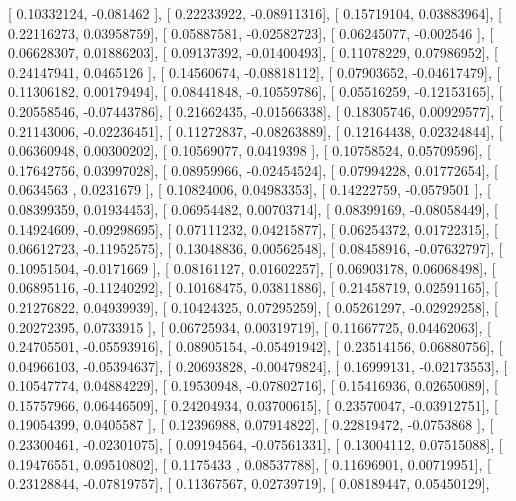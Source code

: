 \documentclass{article}
\begin{document}
       [ 0.10332124, -0.081462  ],
       [ 0.22233922, -0.08911316],
       [ 0.15719104,  0.03883964],
       [ 0.22116273,  0.03958759],
       [ 0.05887581, -0.02582723],
       [ 0.06245077, -0.002546  ],
       [ 0.06628307,  0.01886203],
       [ 0.09137392, -0.01400493],
       [ 0.11078229,  0.07986952],
       [ 0.24147941,  0.0465126 ],
       [ 0.14560674, -0.08818112],
       [ 0.07903652, -0.04617479],
       [ 0.11306182,  0.00179494],
       [ 0.08441848, -0.10559786],
       [ 0.05516259, -0.12153165],
       [ 0.20558546, -0.07443786],
       [ 0.21662435, -0.01566338],
       [ 0.18305746,  0.00929577],
       [ 0.21143006, -0.02236451],
       [ 0.11272837, -0.08263889],
       [ 0.12164438,  0.02324844],
       [ 0.06360948,  0.00300202],
       [ 0.10569077,  0.0419398 ],
       [ 0.10758524,  0.05709596],
       [ 0.17642756,  0.03997028],
       [ 0.08959966, -0.02454524],
       [ 0.07994228,  0.01772654],
       [ 0.0634563 ,  0.0231679 ],
       [ 0.10824006,  0.04983353],
       [ 0.14222759, -0.0579501 ],
       [ 0.08399359,  0.01934453],
       [ 0.06954482,  0.00703714],
       [ 0.08399169, -0.08058449],
       [ 0.14924609, -0.09298695],
       [ 0.07111232,  0.04215877],
       [ 0.06254372,  0.01722315],
       [ 0.06612723, -0.11952575],
       [ 0.13048836,  0.00562548],
       [ 0.08458916, -0.07632797],
       [ 0.10951504, -0.0171669 ],
       [ 0.08161127,  0.01602257],
       [ 0.06903178,  0.06068498],
       [ 0.06895116, -0.11240292],
       [ 0.10168475,  0.03811886],
       [ 0.21458719,  0.02591165],
       [ 0.21276822,  0.04939939],
       [ 0.10424325,  0.07295259],
       [ 0.05261297, -0.02929258],
       [ 0.20272395,  0.0733915 ],
       [ 0.06725934,  0.00319719],
       [ 0.11667725,  0.04462063],
       [ 0.24705501, -0.05593916],
       [ 0.08905154, -0.05491942],
       [ 0.23514156,  0.06880756],
       [ 0.04966103, -0.05394637],
       [ 0.20693828, -0.00479824],
       [ 0.16999131, -0.02173553],
       [ 0.10547774,  0.04884229],
       [ 0.19530948, -0.07802716],
       [ 0.15416936,  0.02650089],
       [ 0.15757966,  0.06446509],
       [ 0.24204934,  0.03700615],
       [ 0.23570047, -0.03912751],
       [ 0.19054399,  0.0405587 ],
       [ 0.12396988,  0.07914822],
       [ 0.22819472, -0.0753868 ],
       [ 0.23300461, -0.02301075],
       [ 0.09194564, -0.07561331],
       [ 0.13004112,  0.07515088],
       [ 0.19476551,  0.09510802],
       [ 0.1175433 ,  0.08537788],
       [ 0.11696901,  0.00719951],
       [ 0.23128844, -0.07819757],
       [ 0.11367567,  0.02739719],
       [ 0.08189447,  0.05450129],
\end{document}

